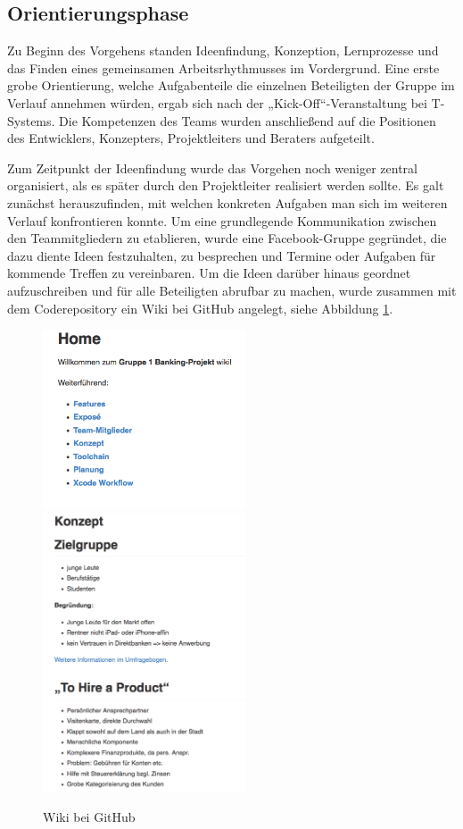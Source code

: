 \subsection{Orientierungsphase}
	Zu Beginn des Vorgehens standen Ideenfindung, Konzeption, Lernprozesse und das Finden eines gemeinsamen Arbeitsrhythmusses im Vordergrund. Eine erste grobe Orientierung, welche Aufgabenteile die einzelnen Beteiligten der Gruppe im Verlauf annehmen würden, ergab sich nach der „Kick-Off“-Veranstaltung bei T-Systems. Die Kompetenzen des Teams wurden anschließend auf die Positionen des Entwicklers, Konzepters, Projektleiters und Beraters aufgeteilt. 
	
	Zum Zeitpunkt der Ideenfindung wurde das Vorgehen noch weniger zentral organisiert, als es später durch den Projektleiter realisiert werden sollte. Es galt zunächst herauszufinden, mit welchen konkreten Aufgaben man sich im weiteren Verlauf konfrontieren konnte. Um eine grundlegende Kommunikation zwischen den Teammitgliedern zu etablieren, wurde eine Facebook-Gruppe gegründet, die dazu diente Ideen festzuhalten, zu besprechen und Termine oder Aufgaben für kommende Treffen zu vereinbaren. Um die Ideen darüber hinaus geordnet aufzuschreiben und für alle Beteiligten abrufbar zu machen, wurde zusammen mit dem Coderepository ein Wiki bei GitHub angelegt, siehe Abbildung \ref{fig:WikiHome}.
	
\begin{figure}[h]
	\centering
	\includegraphics[width=6cm]{Pictures/wiki_home}
	\includegraphics[width=6cm]{Pictures/wiki-konzept}
	\caption{Wiki bei GitHub\label{fig:WikiHome}}
\end{figure}

